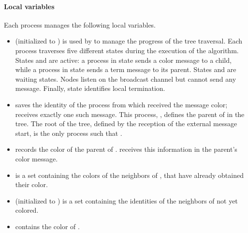 \documentclass[11pt,english]{article}
\newcommand{\df}[1]{}\newcommand{\ccolor}{{\sc color}\xspace}
\newcommand{\term}{{\sc term}\xspace}
\begin{document}
\paragraph{Local variables}
Each process  manages the following local variables. 
\begin{itemize}
\vspace{-0.1cm}
\item  (initialized to ) is used by  to manage the
  progress of the tree traversal.  Each process traverses five
  different states during the execution of the algorithm. States 
  and  are active: a process in state  sends a \ccolor message to
  a child, while a process in state  sends a \term  message to its
  parent.  States  and  are waiting states. Nodes listen on
  the broadcast channel but cannot send any message. Finally, state
   identifies local termination. 
\vspace{-0.2cm}
\item  saves the identity of the process  from which
   received the message {\sc color};  receives
  exactly one such  message.  This process, , defines the parent
  of  in the tree.  The root  of the tree, defined by the
  reception of the external message {\sc start}, is the only
  process such that .
\vspace{-0.2cm}
\item  records the color of the parent of .  
  receives this information in the parent's \ccolor message.\df{This
    was collapsed into the previous one. I found it nicer to split
    them since they are two different variables albeit related.}
\vspace{-0.2cm}
\item  is a set containing the colors of the neighbors of ,
that have  already obtained their color. 
\vspace{-0.2cm}
\item  (initialized to ) is a set
  containing the identities of the neighbors of  not yet
  colored. 
\vspace{-0.2cm}
\item   contains the color of . \df{Same as above. This
    was collapsed into the previous but I preferred to split them.}
\end{itemize}
\end{document}
